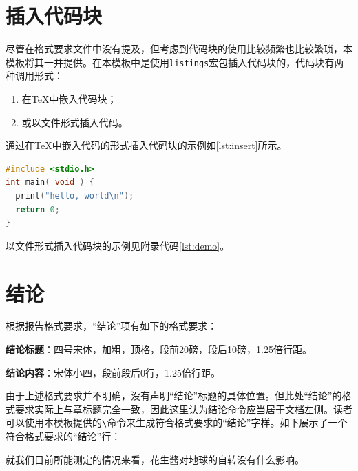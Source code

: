 \section{插入代码块}

尽管在格式要求文件中没有提及，但考虑到代码块的使用比较频繁也比较繁琐，本模板将其一并提供。在本模板中是使用\texttt{listings}宏包插入代码块的，代码块有两种调用形式：

\begin{enumerate}
  \item 在\TeX 中嵌入代码块；
  \item 或以文件形式插入代码。
\end{enumerate}

通过在\TeX 中嵌入代码的形式插入代码块的示例如\ref{lst:insert}所示。

\begin{lstlisting}[language=C, caption={在\TeX 中嵌入代码的形式插入代码块\label{lst:insert}}]
#include <stdio.h>
int main( void ) {
  print("hello, world\n");
  return 0;
}
\end{lstlisting}

以文件形式插入代码块的示例见附录代码\ref{lst:demo}。
    
\section{结论}

根据报告格式要求，“结论”项有如下的格式要求：

\textbf{结论标题}：四号宋体，加粗，顶格，段前20磅，段后10磅，1.25倍行距。

\textbf{结论内容}：宋体小四，段前段后0行，1.25倍行距。

由于上述格式要求并不明确，没有声明“结论”标题的具体位置。但此处“结论”的格式要求实际上与章标题完全一致，因此这里认为结论命令应当居于文档左侧。读者可以使用本模板提供的\texttt{\textbackslash \conclusion}命令来生成符合格式要求的“结论”字样。如下展示了一个符合格式要求的“结论”行：

\conclusion

就我们目前所能测定的情况来看，花生酱对地球的自转没有什么影响\autocite{PeanutButter}。
